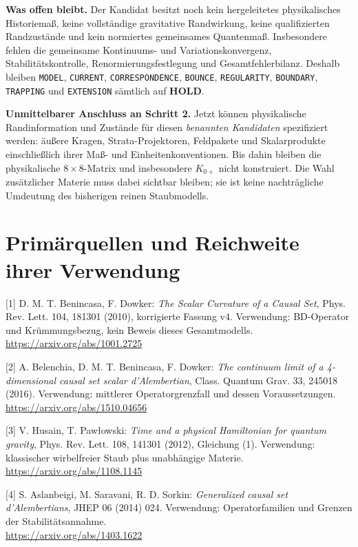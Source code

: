 \documentclass[10pt,a4paper]{article}
\newcommand{\status}[1]{\textsf{\textbf{#1}}}
\newcommand{\sect}[1]{\section*{\color{navy}#1}}
\newcommand{\smallurl}[1]{{\footnotesize\url{#1}}}
\begin{document}
\textbf{Was offen bleibt.}
Der Kandidat besitzt noch kein hergeleitetes physikalisches Historiemaß,
keine vollständige gravitative Randwirkung, keine qualifizierten
Randzustände und kein normiertes gemeinsames Quantenmaß. Insbesondere
fehlen die gemeinsame Kontinuums- und Variationskonvergenz,
Stabilitätskontrolle, Renormierungsfestlegung und Gesamtfehlerbilanz.
Deshalb bleiben \texttt{MODEL}, \texttt{CURRENT}, \texttt{CORRESPONDENCE},
\texttt{BOUNCE}, \texttt{REGULARITY}, \texttt{BOUNDARY}, \texttt{TRAPPING}
und \texttt{EXTENSION} sämtlich auf \status{HOLD}.

\textbf{Unmittelbarer Anschluss an Schritt 2.}
Jetzt können physikalische Randinformation und Zustände für diesen
\emph{benannten Kandidaten} spezifiziert werden: äußere Kragen,
Strata-Projektoren, Feldpakete und Skalarprodukte einschließlich ihrer
Maß- und Einheitenkonventionen. Bis dahin bleiben die physikalische
$8\times8$-Matrix und insbesondere $K_{0+}$ nicht konstruiert.
Die Wahl zusätzlicher Materie muss dabei sichtbar bleiben; sie ist keine
nachträgliche Umdeutung des bisherigen reinen Staubmodells.

\sect{Primärquellen und Reichweite ihrer Verwendung}
\small
[1] D. M. T. Benincasa, F. Dowker: \emph{The Scalar Curvature of a
Causal Set}, Phys. Rev. Lett. 104, 181301 (2010), korrigierte Fassung v4.
Verwendung: BD-Operator und Krümmungsbezug, kein Beweis dieses Gesamtmodells.\\
\smallurl{https://arxiv.org/abs/1001.2725}

[2] A. Belenchia, D. M. T. Benincasa, F. Dowker: \emph{The continuum
limit of a 4-dimensional causal set scalar d'Alembertian},
Class. Quantum Grav. 33, 245018 (2016).
Verwendung: mittlerer Operatorgrenzfall und dessen Voraussetzungen.\\
\smallurl{https://arxiv.org/abs/1510.04656}

[3] V. Husain, T. Pawłowski: \emph{Time and a physical Hamiltonian
for quantum gravity}, Phys. Rev. Lett. 108, 141301 (2012), Gleichung (1).
Verwendung: klassischer wirbelfreier Staub plus unabhängige Materie.\\
\smallurl{https://arxiv.org/abs/1108.1145}

[4] S. Aslanbeigi, M. Saravani, R. D. Sorkin: \emph{Generalized causal
set d'Alembertians}, JHEP 06 (2014) 024.
Verwendung: Operatorfamilien und Grenzen der Stabilitätsannahme.\\
\smallurl{https://arxiv.org/abs/1403.1622}
\end{document}
